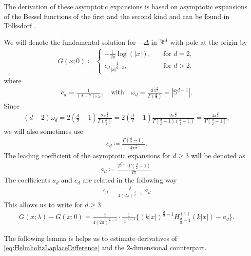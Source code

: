 The derivation of these asymptotic expansions is based on asymptotic expansions of the Bessel functions of the first and the second kind and can be found in Tolksdorf \cite{tolksdorfDiss}.

We will denote the fundamental solution for $-\Delta$ in $\mathbb{R}^d$ with pole at the origin by
\begin{align*}
  G(x;0) \coloneqq \begin{cases} -\frac{1}{2\pi} \log(|x|), &\quad\text{for } d = 2, \\c_d \frac{1}{|x|^{d - 2}}, &\quad\text{for } d > 2,  \end{cases}
\end{align*}
where
\begin{align*}
  c_d = \frac{1}{(d - 2) \omega_d}, \quad\text{with}\quad \omega_d = \frac{2\pi^{\frac{d}{2}}}{\Gamma(\frac{d}{2})} = |\mathbb{S}^{d - 1}|.
\end{align*}
Since
\begin{align*}
  (d - 2) \omega_d 
  = 2 ( \frac{d}{2} - 1) \frac{2 \pi^{\frac{d}{2}}}{\Gamma(\frac{d}{2})}
  =  2 (\frac{d}{2} - 1) \frac{2 \pi^{\frac{d}{2}}}{\Gamma(\frac{d}{2} - 1)(\frac{d}{2} - 1)}
  = \frac{4 \pi^{\frac{d}{2}}}{\Gamma(\frac{d}{2} - 1)},
\end{align*}
we will also sometimes use
\begin{align*}
  c_d \coloneqq \frac{\Gamma(\frac{d}{2} - 1)}{4 \pi^{\frac{d}{2}}}.
\end{align*}
The leading coefficient of the asymptotic expansions for $d \geq 3$ will be denoted as
\begin{align}
  \label{eq:Defnad}
  a_d \coloneqq \frac{2^{\frac{d}{2} - 1} \Gamma(\frac{d}{2} - 1)}{\ii \pi}.
\end{align}
The coefficients $a_d$ and $c_d$ are related in the following way
\begin{align*}
  c_d 
  =\frac{\ii} {4 (2 \pi)^{\frac{d}{2} - 1}}\; a_d 
\end{align*}
This allows us to write for $d \geq 3$
\begin{align}
  \label{eq:HelmholtzLaplaceDifference}
  G(x;\lambda) - G(x; 0) = \frac{i}{4(2\pi)^{\frac{d}{2} - 1}} \cdot \frac{1}{|x|^{d - 2}} \Big\{ (k|x|)^{\frac{d}{2} - 1} H_{\frac{d}{2} - 1}^{(1)}(k|x|) - a_d \Big\}.
\end{align}

The following lemma is helps us to estimate derivatives of \eqref{eq:HelmholtzLaplaceDifference} and the $2$-dimensional counterpart.

